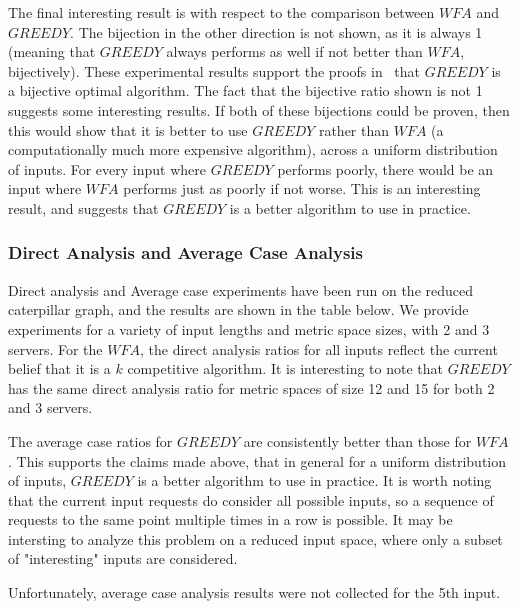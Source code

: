 The final interesting result is with respect to the comparison between $WFA$ and $GREEDY$. The bijection in the other direction is not shown, as it is always 1 (meaning that $GREEDY$ always performs as well if not better than $WFA$, bijectively). These experimental results support the proofs in~\cite{bij2016} that $GREEDY$ is a bijective optimal algorithm. The fact that the bijective ratio shown is not 1 suggests some interesting results. If both of these bijections could be proven, then this would show that it is better to use $GREEDY$ rather than $WFA$ (a computationally much more expensive algorithm), across a uniform distribution of inputs. For every input where $GREEDY$ performs poorly, there would be an input where $WFA$ performs just as poorly if not worse. This is an interesting result, and suggests that $GREEDY$ is a better algorithm to use in practice.

\subsubsection*{Direct Analysis and Average Case Analysis}
Direct analysis and Average case experiments have been run on the reduced caterpillar graph, and the results are shown in the table below. We provide experiments for a variety of input lengths and metric space sizes, with 2 and 3 servers. For the $WFA$, the direct analysis ratios for all inputs reflect the current belief that it is a $k$ competitive algorithm. It is interesting to note that $GREEDY$ has the same direct analysis ratio for metric spaces of size 12 and 15 for both 2 and 3 servers.

The average case ratios for $GREEDY$ are consistently better than those for $WFA$. This supports the claims made above, that in general for a uniform distribution of inputs, $GREEDY$ is a better algorithm to use in practice. It is worth noting that the current input requests do consider all possible inputs, so a sequence of requests to the same point multiple times in a row is possible. It may be intersting to analyze this problem on a reduced input space, where only a subset of "interesting" inputs are considered.

Unfortunately, average case analysis results were not collected for the 5th input. 

